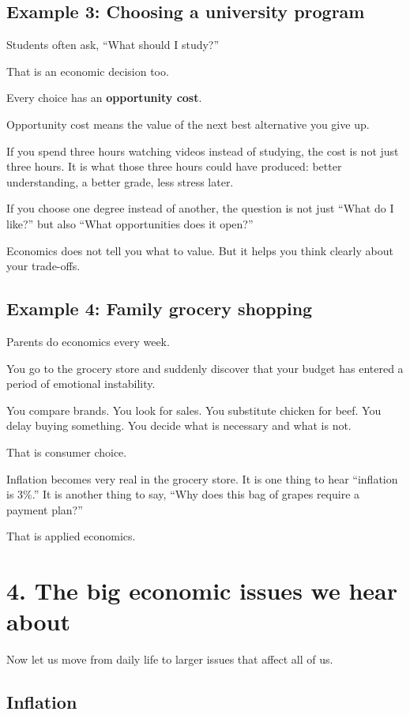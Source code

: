 \documentclass[12pt]{article}
\begin{document}
\subsection*{Example 3: Choosing a university program}

Students often ask, ``What should I study?''

That is an economic decision too.

Every choice has an \textbf{opportunity cost}.

Opportunity cost means the value of the next best alternative you give up.

If you spend three hours watching videos instead of studying, the cost is not just three hours. It is what those three hours could have produced: better understanding, a better grade, less stress later.

If you choose one degree instead of another, the question is not just ``What do I like?'' but also ``What opportunities does it open?''

Economics does not tell you what to value.  
But it helps you think clearly about your trade-offs.

\subsection*{Example 4: Family grocery shopping}

Parents do economics every week.

You go to the grocery store and suddenly discover that your budget has entered a period of emotional instability.

You compare brands.  
You look for sales.  
You substitute chicken for beef.  
You delay buying something.  
You decide what is necessary and what is not.

That is consumer choice.

Inflation becomes very real in the grocery store.  
It is one thing to hear ``inflation is 3\%.''  
It is another thing to say, ``Why does this bag of grapes require a payment plan?''

That is applied economics.

\section*{4. The big economic issues we hear about}

Now let us move from daily life to larger issues that affect all of us.

\subsection*{Inflation}
\end{document}
